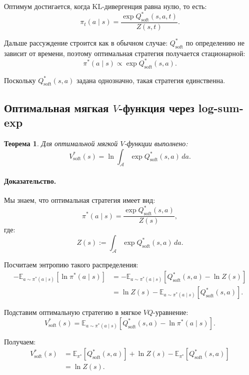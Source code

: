 \documentclass[12pt,a4paper]{article}
\newtheorem{theorem}{Теорема}
\begin{document}
Оптимум достигается, когда KL-дивергенция равна нулю, то есть:
\[
\pi_t(a\mid s)
=
\frac{
\exp Q^\ast_{\mathrm{soft}}(s,a,t)
}{
Z(s,t)
}.
\]

Дальше рассуждение строится как в обычном случае: $Q^\ast_{\mathrm{soft}}$ по определению не зависит от времени, поэтому оптимальная стратегия получается стационарной:
\[
\pi^\ast(a\mid s)
\propto
\exp Q^\ast_{\mathrm{soft}}(s,a).
\]

Поскольку $Q^\ast_{\mathrm{soft}}(s,a)$ задана однозначно, такая стратегия единственна.

\subsection{Оптимальная мягкая $V$-функция через log-sum-exp}

\begin{theorem}
Для оптимальной мягкой $V$-функции выполнено:
\[
V^\ast_{\mathrm{soft}}(s)
=
\ln
\int_{\mathcal A}
\exp Q^\ast_{\mathrm{soft}}(s,a)
\,da.
\]
\end{theorem}

\paragraph{Доказательство.}

Мы знаем, что оптимальная стратегия имеет вид:
\[
\pi^\ast(a\mid s)
=
\frac{
\exp Q^\ast_{\mathrm{soft}}(s,a)
}{
Z(s)
},
\]
где:
\[
Z(s)
:=
\int_{\mathcal A}
\exp Q^\ast_{\mathrm{soft}}(s,a)
\,da.
\]

Посчитаем энтропию такого распределения:
\[
\begin{aligned}
-
\mathbb E_{a\sim\pi^\ast(a\mid s)}
\left[
\ln\pi^\ast(a\mid s)
\right]
&=
-
\mathbb E_{a\sim\pi^\ast(a\mid s)}
\left[
Q^\ast_{\mathrm{soft}}(s,a)
-
\ln Z(s)
\right]
\\
&=
\ln Z(s)
-
\mathbb E_{a\sim\pi^\ast(a\mid s)}
\left[
Q^\ast_{\mathrm{soft}}(s,a)
\right].
\end{aligned}
\]

Подставим оптимальную стратегию в мягкое $VQ$-уравнение:
\[
V^\ast_{\mathrm{soft}}(s)
=
\mathbb E_{a\sim\pi^\ast(a\mid s)}
\left[
Q^\ast_{\mathrm{soft}}(s,a)
-
\ln\pi^\ast(a\mid s)
\right].
\]

Получаем:
\[
\begin{aligned}
V^\ast_{\mathrm{soft}}(s)
&=
\mathbb E_{\pi^\ast}
\left[
Q^\ast_{\mathrm{soft}}(s,a)
\right]
+
\ln Z(s)
-
\mathbb E_{\pi^\ast}
\left[
Q^\ast_{\mathrm{soft}}(s,a)
\right]
\\
&=
\ln Z(s).
\end{aligned}
\]
\end{document}
